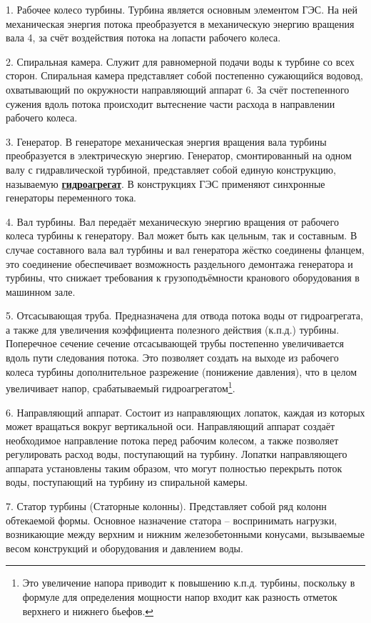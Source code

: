 1. Рабочее колесо турбины. Турбина является основным элементом ГЭС. На ней механическая энергия потока преобразуется в механическую энергию вращения вала 4, за счёт воздействия потока на лопасти рабочего колеса.

2. Спиральная камера. Служит для равномерной подачи воды к турбине со всех сторон. Спиральная камера представляет собой постепенно сужающийся водовод, охватывающий по окружности направляющий аппарат 6. За счёт постепенного сужения вдоль потока происходит вытеснение части расхода в направлении рабочего колеса.

3. Генератор. В генераторе механическая энергия вращения вала турбины преобразуется в электрическую энергию. Генератор, смонтированный на одном валу с гидравлической турбиной, представляет собой единую конструкцию, называемую \textbf{\underline{гидроагрегат}}. В конструкциях ГЭС применяют синхронные генераторы переменного тока. 

4. Вал турбины. Вал передаёт механическую энергию вращения от рабочего колеса турбины к генератору. Вал может быть как цельным, так и составным. В случае составного вала вал турбины и вал генератора жёстко соединены фланцем, это соединение обеспечивает возможность раздельного демонтажа генератора и турбины, что снижает требования к грузоподъёмности кранового оборудования в машинном зале. 

5. Отсасывающая труба. Предназначена для отвода потока воды от гидроагрегата, а также для увеличения коэффициента полезного действия (к.п.д.) турбины. Поперечное сечение сечение отсасывающей трубы постепенно увеличивается вдоль пути следования потока. Это позволяет создать на выходе из рабочего колеса турбины дополнительное разрежение (понижение давления), что в целом увеличивает напор, срабатываемый гидроагрегатом\footnote{Это увеличение напора приводит к повышению к.п.д. турбины, поскольку в формуле для определения мощности напор входит как разность отметок верхнего и нижнего бьефов.}.

6. Направляющий аппарат. Состоит из направляющих лопаток, каждая из которых может вращаться вокруг вертикальной оси. Направляющий аппарат создаёт необходимое направление потока перед рабочим колесом, а также позволяет регулировать расход воды, поступающий на турбину. Лопатки направляющего аппарата установлены таким образом, что могут полностью перекрыть поток воды, поступающий на турбину из спиральной камеры. 

7. Статор турбины (Статорные колонны). Представляет собой ряд колонн обтекаемой формы. Основное назначение статора -- воспринимать нагрузки, возникающие между верхним и нижним железобетонными конусами, вызываемые весом конструкций и оборудования и давлением воды.

